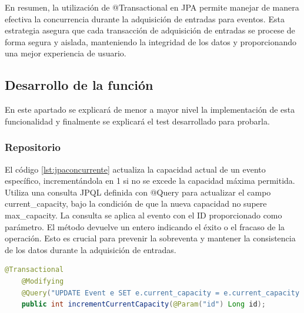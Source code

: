 En resumen, la utilización de @Transactional en JPA permite manejar de manera efectiva la concurrencia durante la adquisición de entradas para eventos. Esta estrategia
asegura que cada transacción de adquisición de entradas se procese de forma segura y aislada, manteniendo la integridad de los datos y proporcionando una mejor experiencia de
usuario.

\subsection{Desarrollo de la función}
En este apartado se explicará de menor a mayor nivel la implementación de esta funcionalidad y finalmente se explicará el test desarrollado para probarla.

\subsubsection*{Repositorio}
El código \ref{lst:jpaconcurrente} actualiza la capacidad actual de un evento específico, incrementándola en 1 si no se excede la capacidad máxima permitida. 
Utiliza una consulta JPQL definida con @Query para actualizar el campo current\_capacity, bajo la condición de que la nueva capacidad no supere max\_capacity. 
La consulta se aplica al evento con el ID proporcionado como parámetro. El método devuelve un entero indicando el éxito o el fracaso de la operación. Esto es crucial para
prevenir la sobreventa y mantener la consistencia de los datos durante la adquisición de entradas.

\myjavastyle
\begin{lstlisting}[language=Java, caption=Función incrementCurrentCapacity, label=lst:jpaconcurrente]
    @Transactional
    @Modifying
    @Query("UPDATE Event e SET e.current_capacity = e.current_capacity + 1 WHERE e.id = :id AND e.current_capacity + 1  <= e.max_capacity")
    public int incrementCurrentCapacity(@Param("id") Long id);
\end{lstlisting}

